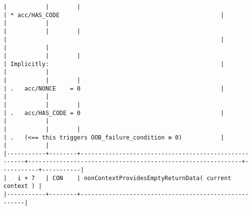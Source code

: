 \documentclass[varwidth=\maxdimen,margin=0.5cm,multi={verbatim}]{standalone}
\begin{document}
\begin{verbatim}
|           |        |                                                      | * acc/HAS_CODE                                              |           |           |
|           |        |                                                      |                                                             |           |           |
|           |        |                                                      | Implicitly:                                                 |           |           |
|           |        |                                                      | .   acc/NONCE    = 0                                        |           |           |
|           |        |                                                      | .   acc/HAS_CODE = 0                                        |           |           |
|           |        |                                                      | .   (<== this triggers OOB_failure_condition ≡ 0)           |           |           |
|-----------+--------+------------------------------------------------------+-------------------------------------------------------------+-----------+-----------|
|   i + 7   | CON    | nonContextProvidesEmptyReturnData( current context ) |
|-----------+--------+------------------------------------------------------|

\end{verbatim}
\end{document}
